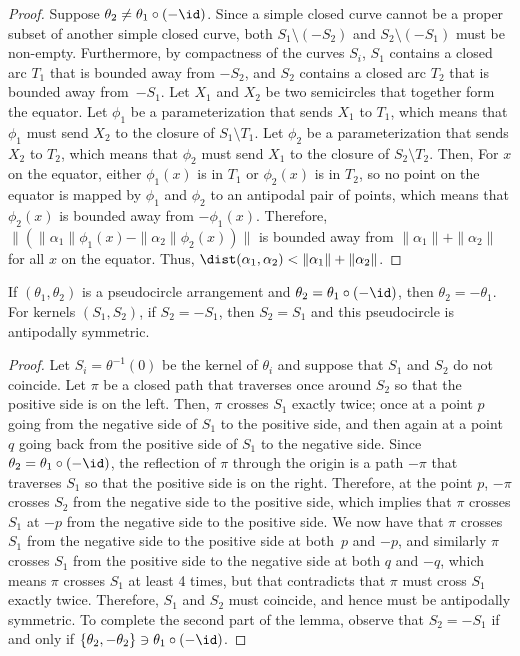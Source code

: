 \begin{proof}
Suppose $\theta_2 \neq \theta_1\circ(-\id)$.
Since a simple closed curve cannot be a proper subset of another simple closed curve, both $S_1 \setminus (-S_2)$ and $S_2 \setminus (-S_1)$ must be non-empty.
Furthermore, by compactness of the curves $S_i$, $S_1$ contains a closed arc $T_1$ that is bounded away from $-S_2$, and $S_2$ contains a closed arc $T_2$ that is bounded away from~$-S_1$. Let $X_1$ and $X_2$ be two semicircles that together form the equator. Let $\phi_1$ be a parameterization that sends $X_1$ to $T_1$, which means that $\phi_1$ must send $X_2$ to the closure of $S_1\setminus T_1$. Let $\phi_2$ be a parameterization that sends $X_2$ to $T_2$, which means that $\phi_2$ must send $X_1$ to the closure of $S_2\setminus T_2$.
Then,
For $x$ on the equator, either $\phi_1(x)$ is in $T_1$ or $\phi_2(x)$ is in $T_2$, so
no point on the equator is mapped by $\phi_1$ and $\phi_2$ to an antipodal pair of points,
which means that $\phi_2(x)$ is bounded away from $-\phi_1(x)$.
Therefore, $\|(\|\alpha_1\|\phi_1(x) - \|\alpha_2\|\phi_2(x))\|$ is bounded away from $\|\alpha_1\| + \|\alpha_2\|$ for all $x$ on the equator. Thus, $\dist(\alpha_1,\alpha_2) < \|\alpha_1\|+\|\alpha_2\|$.
\end{proof}

\begin{lemma}\label{lemma-reflections}
If $(\theta_1,\theta_2)$ is a pseudocircle arrangement and $\theta_2 = \theta_1 \circ (-\id)$,
then $\theta_2 = -\theta_1$. For kernels $(S_1,S_2)$, if $S_2 = -S_1$, then $S_2 = S_1$ and this pseudocircle is antipodally symmetric.
\end{lemma}

\begin{proof}
Let $S_i = \theta^{-1}(0)$ be the kernel of $\theta_i$ and suppose that $S_1$ and $S_2$ do not coincide.
Let $\pi$ be a closed path that traverses once around $S_2$ so that the positive side is on the left.
Then, $\pi$ crosses $S_1$ exactly twice; once at a point $p$ going from the negative side of $S_1$ to the positive side, and then again at a point $q$ going back from the positive side of $S_1$ to the negative side.
Since $\theta_2 = \theta_1 \circ (-\id)$, the reflection of $\pi$ through the origin is a path $-\pi$ that traverses $S_1$ so that the positive side is on the right.
Therefore, at the point $p$, $-\pi$ crosses $S_2$ from the negative side to the positive side, which implies that $\pi$ crosses $S_1$ at $-p$ from the negative side to the positive side.
We now have that $\pi$ crosses $S_1$ from the negative side to the positive side at both~$p$ and $-p$, and similarly $\pi$ crosses $S_1$ from the positive side to the negative side at both $q$ and $-q$, which means $\pi$ crosses $S_1$ at least 4 times, but that contradicts that $\pi$ must cross $S_1$ exactly twice.
Therefore, $S_1$ and $S_2$ must coincide, and hence must be antipodally symmetric.
To complete the second part of the lemma, observe that $S_2 = -S_1$ if and only if $\{\theta_2,-\theta_2\} \ni \theta_1 \circ (-\id)$.
\end{proof}

